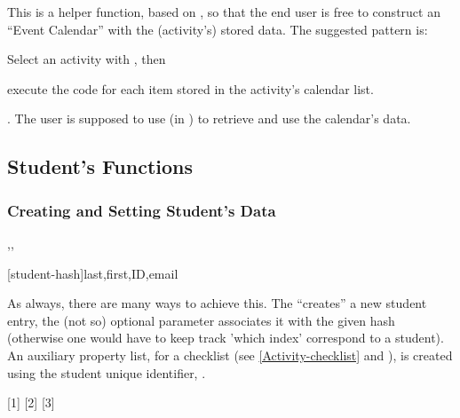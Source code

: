 \documentclass[10pt]{article}
\begin{document}
\begin{codedescribe}{\ActivityCalendarIterate}
  \begin{codesyntax}
  \end{codesyntax}
  This is a helper function, based on , so that the end user is free to construct an ``Event Calendar'' with the (activity's) stored data. The suggested pattern is: 
  \begin{enumerate*}
    \item Select an activity with \tsobj{\ActivitySelect}, then
    \item execute the code for each item stored in the activity's calendar list.
  \end{enumerate*}. The user is supposed to use (in ) \tsobj[code,sep=or]{\DataField,\DataGet} to retrieve and use the calendar's data.
\end{codedescribe}



\subsection{Student's Functions}

\subsubsection{Creating and Setting Student's Data}\label{student:new}

\begin{codedescribe}{\student,\studentremark,\worktitle}
  \begin{codesyntax}
    \tsmacro{\student}[student-hash]{last,first,ID,email}
  \end{codesyntax}
  As always, there are many ways to achieve this. The \tsobj{\student} ``creates'' a new student entry, the (not so) optional parameter  associates it with the given hash (otherwise one would have to keep track 'which index' correspond to a student). An auxiliary property list, for a checklist (see \ref{Activity-checklist} and \tsobj{\StudentCheckListTable} ), is created using  the student unique identifier, .
\end{codedescribe}

[1]
[2]
[3]
\end{document}
